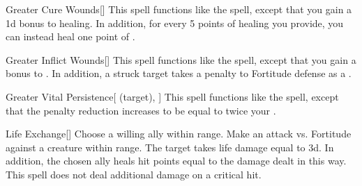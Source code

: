 \lowercase{\hypertarget{spell:Greater Cure Wounds}{}}\label{spell:Greater Cure Wounds}
\begin{apability}[\nth{3}]{\hypertarget{spell:Greater Cure Wounds}{Greater Cure Wounds}}[]
This spell functions like the  spell, except that you gain a \plus1d bonus to healing.
In addition, for every 5 points of healing you provide, you can instead heal one point of .
\end{apability}
\vspace{0.25em}



\lowercase{\hypertarget{spell:Greater Inflict Wounds}{}}\label{spell:Greater Inflict Wounds}
\begin{apability}[\nth{3}]{\hypertarget{spell:Greater Inflict Wounds}{Greater Inflict Wounds}}[]
This spell functions like the  spell, except that you gain a  bonus to .
In addition, a struck target takes a  penalty to Fortitude defense as a .
\end{apability}
\vspace{0.25em}



\lowercase{\hypertarget{spell:Greater Vital Persistence}{}}\label{spell:Greater Vital Persistence}
\begin{attuneability}[\nth{4}]{\hypertarget{spell:Greater Vital Persistence}{Greater Vital Persistence}}[ (target), ]
This spell functions like the  spell, except that the penalty reduction increases to be equal to twice your .
\end{attuneability}
\vspace{0.25em}



\lowercase{\hypertarget{spell:Life Exchange}{}}\label{spell:Life Exchange}
\begin{apability}[\nth{4}]{\hypertarget{spell:Life Exchange}{Life Exchange}}[]
Choose a willing ally within \rngmed range.
Make an attack vs. Fortitude against a creature within \rngmed range.
\hit The target takes life damage equal to  \plus3d.
In addition, the chosen ally heals hit points equal to the damage dealt in this way.
\crit This spell does not deal additional damage on a critical hit.
\end{apability}
\vspace{0.25em}




